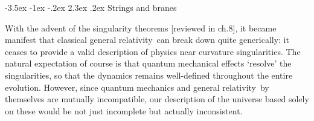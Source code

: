 \documentclass[12pt]{article}
\makeatletter
\renewcommand\section{\@startsection {section}{1}{\z@}%
                                   {-3.5ex \@plus -1ex \@minus -.2ex}%
                                   {2.3ex \@plus.2ex}%
                                   {\normalfont\large\bfseries}}
\def\GR{general relativity}
\makeatother
\begin{document}
\section{Strings and branes}
\label{s:preAC}

With the advent of the singularity theorems [reviewed in ch.8], it became manifest that classical \GR\ can break down quite generically: it ceases to provide a valid description of physics near curvature singularities.  The natural expectation of course is that quantum mechanical effects `resolve' the singularities, so that the dynamics remains well-defined throughout the entire evolution.  
However, since quantum mechanics and \GR\ by themselves are mutually incompatible, our description of the universe based solely on these would be not just incomplete but actually inconsistent.
\end{document}
